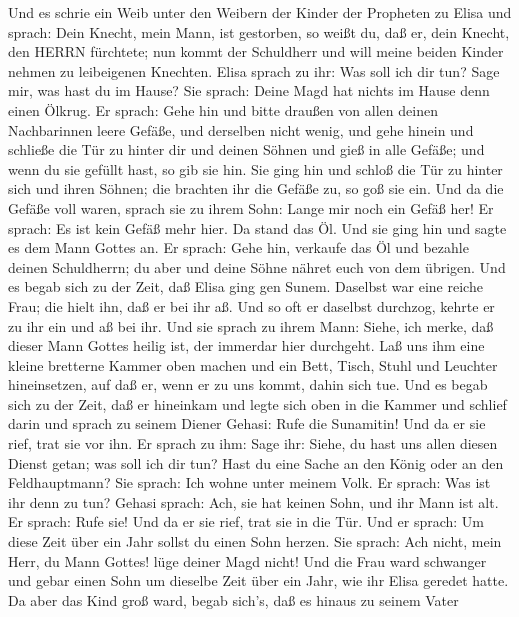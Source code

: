  Und es schrie ein Weib unter den Weibern der Kinder der
Propheten zu Elisa und sprach: Dein Knecht, mein Mann, ist gestorben, so
weißt du, daß er, dein Knecht, den HERRN fürchtete; nun kommt der
Schuldherr und will meine beiden Kinder nehmen zu leibeigenen Knechten.
 Elisa sprach zu ihr: Was soll ich dir tun? Sage mir, was
hast du im Hause? Sie sprach: Deine Magd hat nichts im Hause denn einen
Ölkrug.  Er sprach: Gehe hin und bitte draußen von allen
deinen Nachbarinnen leere Gefäße, und derselben nicht wenig,
 und gehe hinein und schließe die Tür zu hinter dir und
deinen Söhnen und gieß in alle Gefäße; und wenn du sie gefüllt hast, so
gib sie hin.  Sie ging hin und schloß die Tür zu hinter sich
und ihren Söhnen; die brachten ihr die Gefäße zu, so goß sie ein.
 Und da die Gefäße voll waren, sprach sie zu ihrem Sohn:
Lange mir noch ein Gefäß her! Er sprach: Es ist kein Gefäß mehr hier. Da
stand das Öl.  Und sie ging hin und sagte es dem Mann Gottes
an. Er sprach: Gehe hin, verkaufe das Öl und bezahle deinen Schuldherrn;
du aber und deine Söhne nähret euch von dem übrigen.  Und es
begab sich zu der Zeit, daß Elisa ging gen Sunem. Daselbst war eine
reiche Frau; die hielt ihn, daß er bei ihr aß. Und so oft er daselbst
durchzog, kehrte er zu ihr ein und aß bei ihr.  Und sie
sprach zu ihrem Mann: Siehe, ich merke, daß dieser Mann Gottes heilig
ist, der immerdar hier durchgeht.  Laß uns ihm eine kleine
bretterne Kammer oben machen und ein Bett, Tisch, Stuhl und Leuchter
hineinsetzen, auf daß er, wenn er zu uns kommt, dahin sich tue.
 Und es begab sich zu der Zeit, daß er hineinkam und legte
sich oben in die Kammer und schlief darin  und sprach zu
seinem Diener Gehasi: Rufe die Sunamitin! Und da er sie rief, trat sie
vor ihn.  Er sprach zu ihm: Sage ihr: Siehe, du hast uns
allen diesen Dienst getan; was soll ich dir tun? Hast du eine Sache an
den König oder an den Feldhauptmann? Sie sprach: Ich wohne unter meinem
Volk.  Er sprach: Was ist ihr denn zu tun? Gehasi sprach:
Ach, sie hat keinen Sohn, und ihr Mann ist alt.  Er sprach:
Rufe sie! Und da er sie rief, trat sie in die Tür.  Und er
sprach: Um diese Zeit über ein Jahr sollst du einen Sohn herzen. Sie
sprach: Ach nicht, mein Herr, du Mann Gottes! lüge deiner Magd nicht!
 Und die Frau ward schwanger und gebar einen Sohn um
dieselbe Zeit über ein Jahr, wie ihr Elisa geredet hatte. 
Da aber das Kind groß ward, begab sich's, daß es hinaus zu seinem Vater

